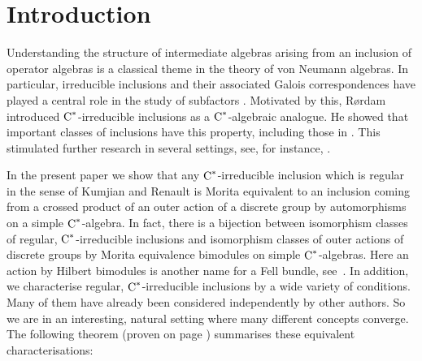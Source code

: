 \documentclass[a4paper]{amsart}
\theoremstyle{plain}
\theoremstyle{definition}
\theoremstyle{remark}
\numberwithin{theorem}{section}
\numberwithin{equation}{section}
\newcommand*{\nb}{\nobreakdash}
\newcommand*{\Cst}{\textup C^*}%
\begin{document}
\section{Introduction}
\label{sec:introduction}

Understanding the structure of intermediate algebras arising from an
inclusion of operator algebras is a classical theme in the theory of
von Neumann algebras.
In particular, irreducible inclusions and their associated Galois
correspondences have played a central role in the study of subfactors
\cites{Jones:Index, Popa:Classification_2, Izumi-Longo-Popa:Galois}.
Motivated by this, Rørdam~\cite{Rordam:Irreducible_inclusions}
introduced \(\Cst\)\nb-irreducible inclusions as a
\(\Cst\)\nb-algebraic analogue.
He showed that important classes of inclusions have this property,
including those in \cites{Izumi:Inclusions_simple,
  Cameron-Smith:Galois_reduced, Amrutam:Intermediate_subalgebras,
  Amrutam_Kalantar:Simplicity_intermediate}.
This stimulated further research in several settings, see, for
instance, \cites{Bedos_Omland:C*-irreducibility,
  Li_Scarparo:C*-irreducibility, Echterhoff-Rordam:Inclusions,
  Mukohara:Inclusions, Zarikian:Unique_pseudo,
  Bakshi-Gupta:Regular_inclusions}.

In the present paper we show that any \(\Cst\)\nb-irreducible
inclusion which is regular in the sense of Kumjian and Renault
\cites{Kumjian:Diagonals, Renault:Cartan.Subalgebras} is Morita
equivalent to an inclusion coming from a crossed product of an outer
action of a discrete group by automorphisms on a simple
\(\Cst\)\nb-algebra.
In fact, there is a bijection between isomorphism classes of regular,
\(\Cst\)\nb-irreducible inclusions and isomorphism classes of outer
actions of discrete groups by Morita equivalence bimodules on simple
\(\Cst\)\nb-algebras.
Here an action by Hilbert bimodules is another name for a Fell bundle, see~\cite{Buss-Meyer:Actions_groupoids}.
In addition, we characterise regular, \(\Cst\)\nb-irreducible
inclusions by a wide variety of conditions.
Many of them have already been considered independently by other
authors.
So we are in an interesting, natural setting where many different
concepts converge.
The following theorem (proven on page \pageref{proof:main_theorem})
summarises these equivalent characterisations:
\end{document}
